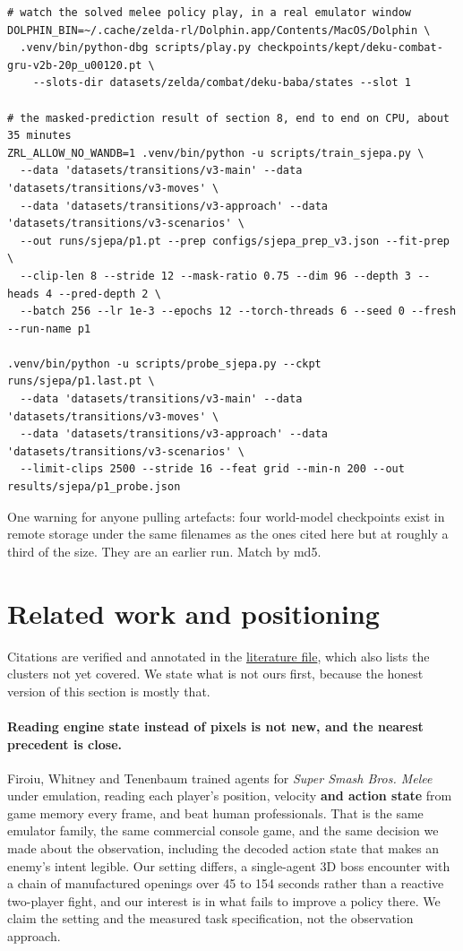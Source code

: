 \documentclass[11pt]{article}
\begin{document}
\begin{Verbatim}[fontsize=\footnotesize,frame=single,framesep=4pt]
# watch the solved melee policy play, in a real emulator window
DOLPHIN_BIN=~/.cache/zelda-rl/Dolphin.app/Contents/MacOS/Dolphin \
  .venv/bin/python-dbg scripts/play.py checkpoints/kept/deku-combat-gru-v2b-20p_u00120.pt \
    --slots-dir datasets/zelda/combat/deku-baba/states --slot 1

# the masked-prediction result of section 8, end to end on CPU, about 35 minutes
ZRL_ALLOW_NO_WANDB=1 .venv/bin/python -u scripts/train_sjepa.py \
  --data 'datasets/transitions/v3-main' --data 'datasets/transitions/v3-moves' \
  --data 'datasets/transitions/v3-approach' --data 'datasets/transitions/v3-scenarios' \
  --out runs/sjepa/p1.pt --prep configs/sjepa_prep_v3.json --fit-prep \
  --clip-len 8 --stride 12 --mask-ratio 0.75 --dim 96 --depth 3 --heads 4 --pred-depth 2 \
  --batch 256 --lr 1e-3 --epochs 12 --torch-threads 6 --seed 0 --fresh --run-name p1

.venv/bin/python -u scripts/probe_sjepa.py --ckpt runs/sjepa/p1.last.pt \
  --data 'datasets/transitions/v3-main' --data 'datasets/transitions/v3-moves' \
  --data 'datasets/transitions/v3-approach' --data 'datasets/transitions/v3-scenarios' \
  --limit-clips 2500 --stride 16 --feat grid --min-n 200 --out results/sjepa/p1_probe.json
\end{Verbatim}

One warning for anyone pulling artefacts: four world-model checkpoints exist in remote storage under the same filenames as the ones cited here but at roughly a third of the size. They are an earlier run. Match by md5.


\section{Related work and positioning}
\label{sec:14}

Citations are verified and annotated in the \href{https://github.com/JordyKieto/ppo-hyrule/blob/main/paper/LITERATURE.md}{literature file}, which also lists the clusters not yet covered. We state what is not ours first, because the honest version of this section is mostly that.

\paragraph{Reading engine state instead of pixels is not new, and the nearest precedent is close.} Firoiu, Whitney and Tenenbaum \cite{firoiu2017melee} trained agents for \emph{Super Smash Bros. Melee} under emulation, reading each player's position, velocity \textbf{and action state} from game memory every frame, and beat human professionals. That is the same emulator family, the same commercial console game, and the same decision we made about the observation, including the decoded action state that makes an enemy's intent legible. Our setting differs, a single-agent 3D boss encounter with a chain of manufactured openings over 45 to 154 seconds rather than a reactive two-player fight, and our interest is in what fails to improve a policy there. We claim the setting and the measured task specification, not the observation approach.
\end{document}
